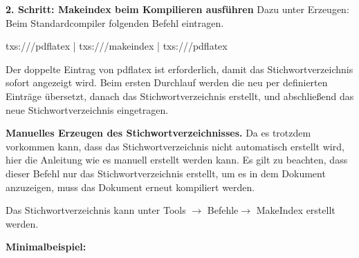 \documentclass[13pt,a4paper, listof=entryprefix, bibliography=totocnumbered,toc=listofnumbered,lof=listofnumbered]{scrartcl}
\newcounter{verzeichnis}
\begin{document}

\textbf{ 2. Schritt: Makeindex beim Kompilieren ausführen}
Dazu unter Erzeugen: Beim Standardcompiler folgenden Befehl eintragen.

txs:///pdflatex | txs:///makeindex | txs:///pdflatex

Der doppelte Eintrag von pdflatex ist erforderlich, damit das Stichwortverzeichnis sofort angezeigt wird. Beim ersten Durchlauf werden die neu per  definierten Einträge übersetzt, danach das Stichwortverzeichnis erstellt, und abschließend das neue Stichwortverzeichnis eingetragen.

\textbf{Manuelles Erzeugen des Stichwortverzeichnisses.}
Da es trotzdem vorkommen kann, dass das Stichwortverzeichnis nicht automatisch erstellt wird, hier die Anleitung wie es manuell erstellt werden kann. Es gilt zu beachten, dass dieser Befehl nur das Stichwortverzeichnis erstellt, um es in dem Dokument anzuzeigen, muss das Dokument erneut kompiliert werden.

Das Stichwortverzeichnis kann unter Tools $\rightarrow$ Befehle$\rightarrow$ MakeIndex erstellt werden.

\vspace{1em}
\textbf{Minimalbeispiel:}
\vspace{1em}
\end{document}
